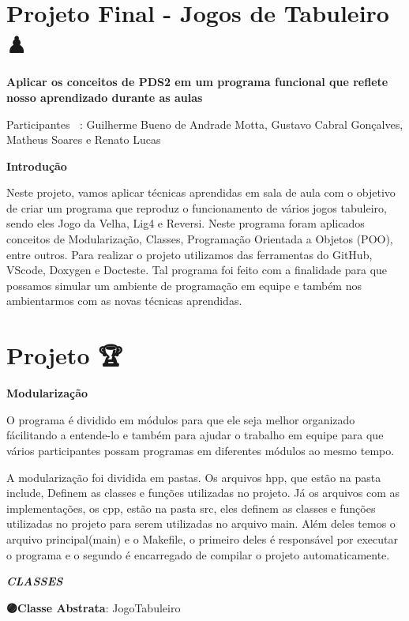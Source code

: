 \section*{Projeto Final -\/ Jogos de Tabuleiro ♟ }

{\bfseries Aplicar os conceitos de P\+D\+S2 em um programa funcional que reflete nosso aprendizado durante as aulas}


\begin{DoxyItemize}
\item Participantes 🧑‍💻\+: Guilherme Bueno de Andrade Motta, Gustavo Cabral Gonçalves, Matheus Soares e Renato Lucas
\end{DoxyItemize}

{\bfseries Introdução}

Neste projeto, vamos aplicar técnicas aprendidas em sala de aula com o objetivo de criar um programa que reproduz o funcionamento de vários jogos tabuleiro, sendo eles Jogo da Velha, Lig4 e Reversi. Neste programa foram aplicados conceitos de Modularização, Classes, Programação Orientada a Objetos (P\+OO), entre outros. Para realizar o projeto utilizamos das ferramentas do Git\+Hub, V\+Scode, Doxygen e Docteste. Tal programa foi feito com a finalidade para que possamos simular um ambiente de programação em equipe e também nos ambientarmos com as novas técnicas aprendidas.\hypertarget{md_README_autotoc_md0}{}\section{Projeto 🏆}\label{md_README_autotoc_md0}
{\bfseries Modularização 🐉}

O programa é dividido em módulos para que ele seja melhor organizado fácilitando a entende-\/lo e também para ajudar o trabalho em equipe para que vários participantes possam programas em diferentes módulos ao mesmo tempo.

A modularização foi dividida em pastas. Os arquivos hpp, que estão na pasta include, Definem as classes e funções utilizadas no projeto. Já os arquivos com as implementações, os cpp, estão na pasta src, eles definem as classes e funções utilizadas no projeto para serem utilizadas no arquivo main. Além deles temos o arquivo principal(main) e o Makefile, o primeiro deles é responsável por executar o programa e o segundo é encarregado de compilar o projeto automaticamente.

{\itshape {\bfseries C\+L\+A\+S\+S\+E\+S🥋}}

{\bfseries 🟣\+Classe Abstrata}\+: Jogo\+Tabuleiro

